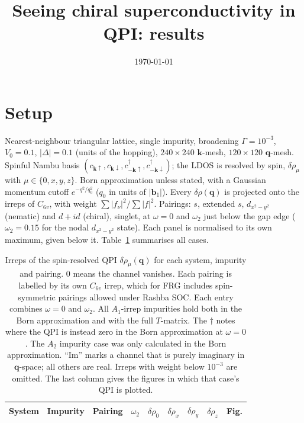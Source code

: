 \documentclass[aps,prb,twocolumn,superscriptaddress,nofootinbib]{revtex4-2}
\newcommand{\bk}{\bm{k}}
\newcommand{\bq}{\bm{q}}
\begin{document}
\title{Seeing chiral superconductivity in QPI: results}

\date{\today}

\maketitle

\section{Setup}

Nearest-neighbour triangular lattice, single impurity, broadening $\Gamma = 10^{-3}$, $V_0 = 0.1$, $|\Delta| = 0.1$ (units of the hopping), $240 \times 240$ $\bk$-mesh, $120 \times 120$ $\bq$-mesh.
Spinful Nambu basis $(c_{\bk\uparrow}, c_{\bk\downarrow}, c^\dagger_{-\bk\uparrow}, c^\dagger_{-\bk\downarrow})$; the LDOS is resolved by spin, $\delta\rho_\mu$ with $\mu \in \{0, x, y, z\}$.
Born approximation unless stated, with a Gaussian momentum cutoff $e^{-q^2/q_0^2}$ ($q_0$ in units of $|\bm b_1|$).
Every $\delta\rho(\bq)$ is projected onto the irreps of $C_{6v}$, with weight $\sum|f_\nu|^2 / \sum|f|^2$.
Pairings: $s$, extended $s$, $d_{x^2-y^2}$ (nematic) and $d+id$ (chiral), singlet, at $\omega = 0$ and $\omega_2$ just below the gap edge ($\omega_2 = 0.15$ for the nodal $d_{x^2-y^2}$ state).
Each panel is normalised to its own maximum, given below it.
Table~\ref{tab:cases} summarises all cases.

\begin{table}[tp]
    \caption{Irreps of the spin-resolved QPI $\delta\rho_\mu(\bq)$ for each system, impurity and pairing. $0$ means the channel vanishes.
    Each pairing is labelled by its own $C_{6v}$ irrep, which for FRG includes spin-symmetric pairings allowed under Rashba SOC.
    Each entry combines $\omega = 0$ and $\omega_2$.
    All $A_1$-irrep impurities hold both in the Born approximation and with the full $T$-matrix. The $\dagger$ notes where the QPI is instead zero in the Born approximation at $\omega=0$. The $A_2$ impurity case was only calculated in the Born approximation.
    ``Im'' marks a channel that is purely imaginary in $\bq$-space; all others are real.
    Irreps with weight below $10^{-3}$ are omitted.
    The last column gives the figures in which that case's QPI is plotted.}
    \label{tab:cases}
    \begin{ruledtabular}
    \begin{tabular}{lllllllll}
        System & Impurity & Pairing & $\omega_2$ & $\delta\rho_0$ & $\delta\rho_x$ & $\delta\rho_y$ & $\delta\rho_z$ & Fig. \\
        \hline
        
    \end{tabular}
    \end{ruledtabular}
\end{table}
\end{document}
